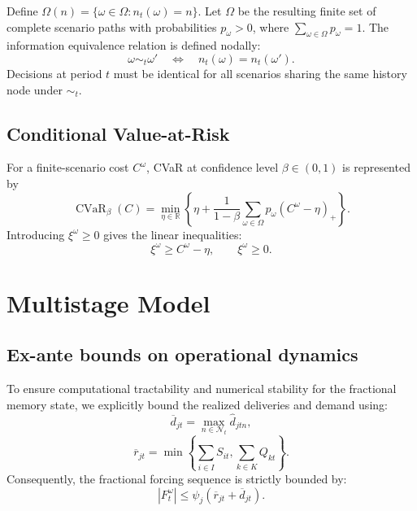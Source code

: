 \documentclass[11pt,a4paper]{article}
\newcommand{\R}{\mathbb{R}}
\newcommand{\CVaR}{\operatorname{CVaR}}
\begin{document}
Define \(\Omega(n) = \{\omega\in\Omega:n_t(\omega)=n\}\). Let \(\Omega\) be the resulting finite set of complete scenario paths with
probabilities \(p_\omega>0\), where \(\sum_{\omega\in\Omega}p_\omega=1\).
The information equivalence relation is defined nodally:
\begin{equation}
  \omega\sim_t\omega'
  \quad\Longleftrightarrow\quad
  n_t(\omega)=n_t(\omega').
  \label{eq:history-equivalence}
\end{equation}
Decisions at period \(t\) must be identical for all scenarios sharing the
same history node under \(\sim_t\).

\subsection{Conditional Value-at-Risk}

For a finite-scenario cost \(C^\omega\), CVaR at confidence level
\(\beta\in(0,1)\) is represented by
\begin{equation}
  \CVaR_\beta(C)
  =
  \min_{\eta\in\R}
  \left\{
    \eta
    +
    \frac{1}{1-\beta}
    \sum_{\omega\in\Omega}
    p_\omega
    \left(C^\omega-\eta\right)_+
  \right\}.
  \label{eq:cvar-definition}
\end{equation}
Introducing \(\xi^\omega\geq0\) gives the linear inequalities:
\begin{equation}
  \xi^\omega\geq C^\omega-\eta,
  \qquad
  \xi^\omega\geq0.
  \label{eq:cvar-linearization}
\end{equation}

\section{Multistage Model}
\label{sec:model}

\subsection{Ex-ante bounds on operational dynamics}
To ensure computational tractability and numerical stability for the fractional memory state, we explicitly bound the realized deliveries and demand using:
\[
\overline d_{jt}
=
\max_{n\in\mathcal N_t}\widehat d_{jtn},
\]
\[
\overline r_{jt}
=
\min
\left\{
\sum_{i\in I}S_{it},
\sum_{k\in K}Q_{kt}
\right\}.
\]
Consequently, the fractional forcing sequence is strictly bounded by:
\[
|F_t^\omega|
\le
\psi_j
\left(
\overline r_{jt}+\overline d_{jt}
\right).
\]
\end{document}
